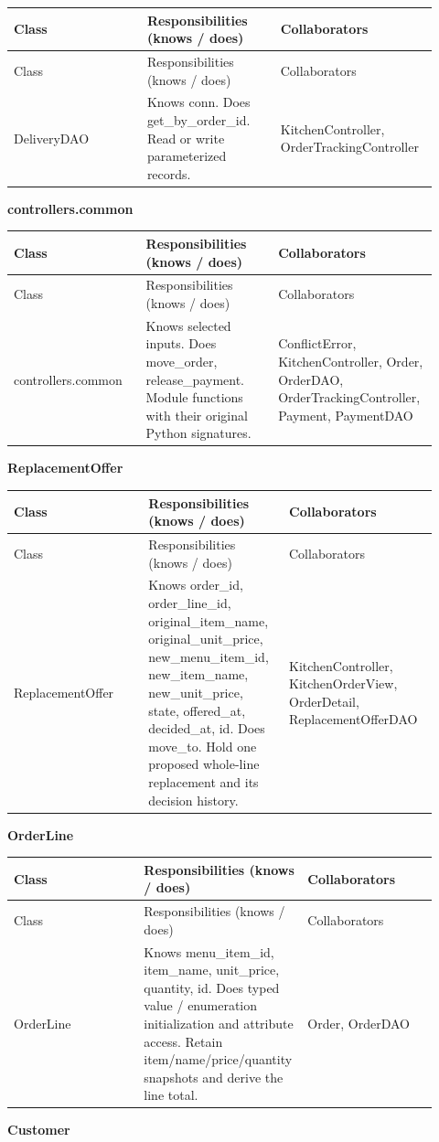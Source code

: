 \begin{longtable}{>{\raggedright\arraybackslash}p{0.3067\linewidth}>{\raggedright\arraybackslash}p{0.3067\linewidth}>{\raggedright\arraybackslash}p{0.3067\linewidth}}
Class & Responsibilities (knows / does) & Collaborators \\
\hline\endfirsthead
Class & Responsibilities (knows / does) & Collaborators \\
\hline\endhead
DeliveryDAO & Knows conn. Does get\_by\_order\_id. Read or write parameterized records. & KitchenController, OrderTrackingController \\
\end{longtable}
\textbf{controllers.common}

\begin{longtable}{>{\raggedright\arraybackslash}p{0.3067\linewidth}>{\raggedright\arraybackslash}p{0.3067\linewidth}>{\raggedright\arraybackslash}p{0.3067\linewidth}}
Class & Responsibilities (knows / does) & Collaborators \\
\hline\endfirsthead
Class & Responsibilities (knows / does) & Collaborators \\
\hline\endhead
controllers.common & Knows selected inputs. Does move\_order, release\_payment. Module functions with their original Python signatures. & ConflictError, KitchenController, Order, OrderDAO, OrderTrackingController, Payment, PaymentDAO \\
\end{longtable}
\textbf{ReplacementOffer}

\begin{longtable}{>{\raggedright\arraybackslash}p{0.3067\linewidth}>{\raggedright\arraybackslash}p{0.3067\linewidth}>{\raggedright\arraybackslash}p{0.3067\linewidth}}
Class & Responsibilities (knows / does) & Collaborators \\
\hline\endfirsthead
Class & Responsibilities (knows / does) & Collaborators \\
\hline\endhead
ReplacementOffer & Knows order\_id, order\_line\_id, original\_item\_name, original\_unit\_price, new\_menu\_item\_id, new\_item\_name, new\_unit\_price, state, offered\_at, decided\_at, id. Does move\_to. Hold one proposed whole-line replacement and its decision history. & KitchenController, KitchenOrderView, OrderDetail, ReplacementOfferDAO \\
\end{longtable}
\textbf{OrderLine}

\begin{longtable}{>{\raggedright\arraybackslash}p{0.3067\linewidth}>{\raggedright\arraybackslash}p{0.3067\linewidth}>{\raggedright\arraybackslash}p{0.3067\linewidth}}
Class & Responsibilities (knows / does) & Collaborators \\
\hline\endfirsthead
Class & Responsibilities (knows / does) & Collaborators \\
\hline\endhead
OrderLine & Knows menu\_item\_id, item\_name, unit\_price, quantity, id. Does typed value / enumeration initialization and attribute access. Retain item/name/price/quantity snapshots and derive the line total. & Order, OrderDAO \\
\end{longtable}
\textbf{Customer}

